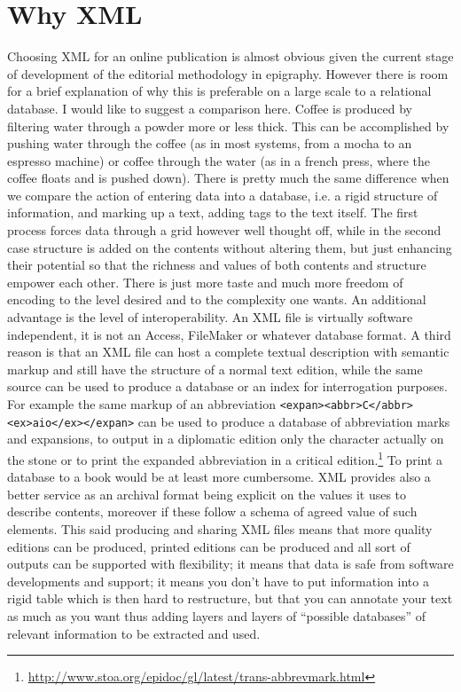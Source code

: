 \documentclass[amsthm,ebook]{saparticle}
\begin{document}
\section{Why XML}
Choosing XML for an online publication is almost obvious given the current stage of development of the editorial methodology in epigraphy. However there is room for a brief explanation of why this is preferable on a large scale to a relational database. I would like to suggest a comparison here. Coffee is produced by filtering water through a powder more or less thick. This can be accomplished by pushing water through the coffee (as in most systems, from a mocha to an espresso machine) or coffee through the water (as in a french press, where the coffee floats and is pushed down). There is pretty much the same difference when we compare the action of entering data into a database, i.e. a rigid structure of information, and marking up a text, adding tags to the text itself. The first process forces data through a grid however well thought off, while in the second case structure is added on the contents without altering them, but just enhancing their potential so that the richness and values of both contents and structure empower each other. There is just more taste and much more freedom of encoding to the level desired and to the complexity one wants. An additional advantage is the level of interoperability. An XML file is virtually software independent, it is not an Access, FileMaker or whatever database format. A third reason is that an XML file can host a complete textual description with semantic markup and still have the structure of a normal text edition, while the same source can be used to produce a database or an index for interrogation purposes. For example the same markup of an abbreviation \texttt{<expan><abbr>C</abbr><ex>aio</ex></expan>} can be used to produce a database of abbreviation marks and expansions, to output in a diplomatic edition only the character actually on the stone or to print the expanded abbreviation in a critical edition.\footnote{\url{http://www.stoa.org/epidoc/gl/latest/trans-abbrevmark.html}} To print a database to a book would be at least more cumbersome. XML provides also a better service as an archival format being explicit on the values it uses to describe contents, moreover if these follow a schema of agreed value of such elements. This said producing and sharing XML files means that more quality editions can be produced, printed editions can be produced and all sort of outputs can be supported with flexibility; it means that data is safe from software developments and support; it means you don't have to put information into a rigid table which is then hard to restructure, but that you can annotate your text as much as you want thus adding layers and layers of ``possible databases'' of relevant information to be extracted and used.   
\end{document}
